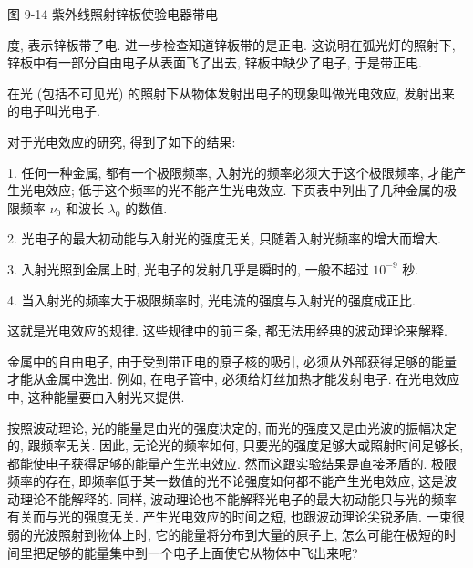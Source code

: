 \documentclass[10pt]{article}
\begin{document}
图 9-14 紫外线照射锌板使验电器带电

度, 表示锌板带了电. 进一步检查知道锌板带的是正电. 这说明在弧光灯的照射下, 锌板中有一部分自由电子从表面飞了出去, 锌板中缺少了电子, 于是带正电.

在光 (包括不可见光) 的照射下从物体发射出电子的现象叫做光电效应, 发射出来的电子叫光电子.

对于光电效应的研究, 得到了如下的结果:

1. 任何一种金属, 都有一个极限频率, 入射光的频率必须大于这个极限频率, 才能产生光电效应; 低于这个频率的光不能产生光电效应. 下页表中列出了几种金属的极限频率 \({\nu }_{0}\) 和波长 \({\lambda }_{0}\) 的数值.

2. 光电子的最大初动能与入射光的强度无关, 只随着入射光频率的增大而增大.

3. 入射光照到金属上时, 光电子的发射几乎是瞬时的, 一般不超过 \({10}^{-9}\) 秒.

4. 当入射光的频率大于极限频率时, 光电流的强度与入射光的强度成正比.

\begin{center}
\end{center}

这就是光电效应的规律. 这些规律中的前三条, 都无法用经典的波动理论来解释.

金属中的自由电子, 由于受到带正电的原子核的吸引, 必须从外部获得足够的能量才能从金属中逸出. 例如, 在电子管中, 必须给灯丝加热才能发射电子. 在光电效应中, 这种能量要由入射光来提供.

按照波动理论, 光的能量是由光的强度决定的, 而光的强度又是由光波的振幅决定的, 跟频率无关. 因此, 无论光的频率如何, 只要光的强度足够大或照射时间足够长, 都能使电子获得足够的能量产生光电效应. 然而这跟实验结果是直接矛盾的. 极限频率的存在, 即频率低于某一数值的光不论强度如何都不能产生光电效应, 这是波动理论不能解释的. 同样, 波动理论也不能解释光电子的最大初动能只与光的频率有关而与光的强度无关. 产生光电效应的时间之短, 也跟波动理论尖锐矛盾. 一束很弱的光波照射到物体上时, 它的能量将分布到大量的原子上, 怎么可能在极短的时间里把足够的能量集中到一个电子上面使它从物体中飞出来呢?
\end{document}
